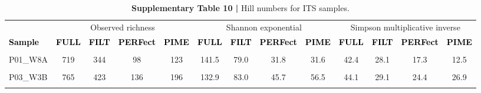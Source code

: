 \documentclass[
  10pt,
  letterpaper,
  DIV=11,
  numbers=noendperiod]{scrartcl}
\begin{document}
\begin{table}[H]

\caption{\textbf{Supplementary Table 10 |} Hill numbers for ITS samples.}
\centering
\fontsize{7}{9}\selectfont
\begin{threeparttable}
\begin{tabular}[t]{lcccccccccccc}
\toprule
\multicolumn{1}{c}{ } & \multicolumn{4}{c}{Observed richness} & \multicolumn{4}{c}{Shannon exponential} & \multicolumn{4}{c}{Simpson multiplicative inverse} \\
\cmidrule(l{3pt}r{3pt}){2-5} \cmidrule(l{3pt}r{3pt}){6-9} \cmidrule(l{3pt}r{3pt}){10-13}
\textcolor{black}{\textbf{Sample}} & \textcolor{black}{\textbf{FULL}} & \textcolor{black}{\textbf{FILT}} & \textcolor{black}{\textbf{PERFect}} & \textcolor{black}{\textbf{PIME}} & \textcolor{black}{\textbf{FULL}} & \textcolor{black}{\textbf{FILT}} & \textcolor{black}{\textbf{PERFect}} & \textcolor{black}{\textbf{PIME}} & \textcolor{black}{\textbf{FULL}} & \textcolor{black}{\textbf{FILT}} & \textcolor{black}{\textbf{PERFect}} & \textcolor{black}{\textbf{PIME}}\\
\midrule
\cellcolor{gray!6}{P01\_W3A} & \cellcolor{gray!6}{945} & \cellcolor{gray!6}{499} & \cellcolor{gray!6}{148} & \cellcolor{gray!6}{181} & \cellcolor{gray!6}{55.9} & \cellcolor{gray!6}{33.8} & \cellcolor{gray!6}{18.5} & \cellcolor{gray!6}{14.8} & \cellcolor{gray!6}{10.7} & \cellcolor{gray!6}{8.4} & \cellcolor{gray!6}{6.8} & \cellcolor{gray!6}{5.6}\\
P01\_W8A & 719 & 344 & 98 & 123 & 141.5 & 79.0 & 31.8 & 31.6 & 42.4 & 28.1 & 17.3 & 12.5\\
\cellcolor{gray!6}{P02\_C0A} & \cellcolor{gray!6}{1011} & \cellcolor{gray!6}{494} & \cellcolor{gray!6}{147} & \cellcolor{gray!6}{238} & \cellcolor{gray!6}{112.5} & \cellcolor{gray!6}{64.0} & \cellcolor{gray!6}{38.1} & \cellcolor{gray!6}{43.3} & \cellcolor{gray!6}{36.1} & \cellcolor{gray!6}{26.2} & \cellcolor{gray!6}{21.9} & \cellcolor{gray!6}{19.9}\\
\addlinespace
P03\_W3B & 765 & 423 & 136 & 196 & 132.9 & 83.0 & 45.7 & 56.5 & 44.1 & 29.1 & 24.4 & 26.9\\
\cellcolor{gray!6}{P03\_W8B} & \cellcolor{gray!6}{349} & \cellcolor{gray!6}{204} & \cellcolor{gray!6}{64} & \cellcolor{gray!6}{109} & \cellcolor{gray!6}{112.1} & \cellcolor{gray!6}{72.2} & \cellcolor{gray!6}{26.2} & \cellcolor{gray!6}{42.8} & \cellcolor{gray!6}{49.0} & \cellcolor{gray!6}{36.4} & \cellcolor{gray!6}{17.8} & \cellcolor{gray!6}{23.7}\\

\end{tabular}
\end{threeparttable}
\end{table}
\end{document}
